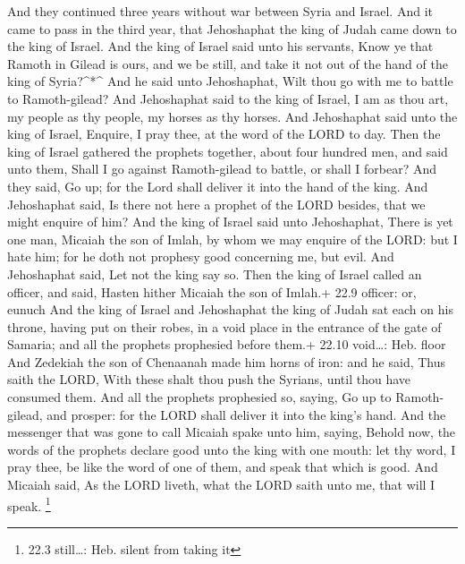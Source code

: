  And they continued three years without war between Syria
and Israel.  And it came to pass in the third year, that
Jehoshaphat the king of Judah came down to the king of Israel.
 And the king of Israel said unto his servants, Know ye that
Ramoth in Gilead is ours, and we be still, and take it not out of the
hand of the king of Syria?\^{}*\^{}  And he said unto
Jehoshaphat, Wilt thou go with me to battle to Ramoth-gilead? And
Jehoshaphat said to the king of Israel, I am as thou art, my people as
thy people, my horses as thy horses.  And Jehoshaphat said
unto the king of Israel, Enquire, I pray thee, at the word of the LORD
to day.  Then the king of Israel gathered the prophets
together, about four hundred men, and said unto them, Shall I go against
Ramoth-gilead to battle, or shall I forbear? And they said, Go up; for
the Lord shall deliver it into the hand of the king.  And
Jehoshaphat said, Is there not here a prophet of the LORD besides, that
we might enquire of him?  And the king of Israel said unto
Jehoshaphat, There is yet one man, Micaiah the son of Imlah, by whom we
may enquire of the LORD: but I hate him; for he doth not prophesy good
concerning me, but evil. And Jehoshaphat said, Let not the king say so.
 Then the king of Israel called an officer, and said, Hasten
hither Micaiah the son of Imlah.+ 22.9 officer: or, eunuch 
And the king of Israel and Jehoshaphat the king of Judah sat each on his
throne, having put on their robes, in a void place in the entrance of
the gate of Samaria; and all the prophets prophesied before them.+ 22.10
void\ldots: Heb. floor  And Zedekiah the son of Chenaanah
made him horns of iron: and he said, Thus saith the LORD, With these
shalt thou push the Syrians, until thou have consumed them.
 And all the prophets prophesied so, saying, Go up to
Ramoth-gilead, and prosper: for the LORD shall deliver it into the
king's hand.  And the messenger that was gone to call
Micaiah spake unto him, saying, Behold now, the words of the prophets
declare good unto the king with one mouth: let thy word, I pray thee, be
like the word of one of them, and speak that which is good.
 And Micaiah said, As the LORD liveth, what the LORD saith
unto me, that will I speak. \footnote{22.3 still\ldots: Heb. silent from
  taking it}

